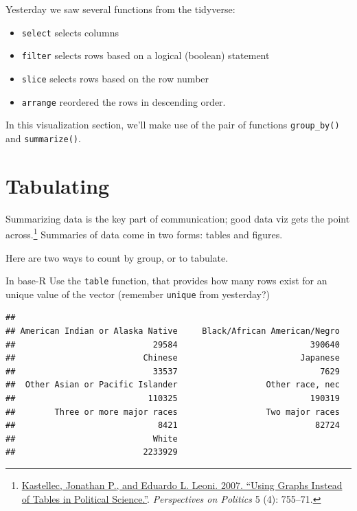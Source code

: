 \documentclass[]{book}
\newenvironment{Shaded}{\begin{snugshade}}{\end{snugshade}}
\newcommand{\KeywordTok}[1]{\textcolor[rgb]{0.13,0.29,0.53}{\textbf{#1}}}
\newcommand{\NormalTok}[1]{#1}
\newcommand{\OperatorTok}[1]{\textcolor[rgb]{0.81,0.36,0.00}{\textbf{#1}}}
\providecommand{\tightlist}{%
  \setlength{\itemsep}{0pt}\setlength{\parskip}{0pt}}
\let\rmarkdownfootnote\footnote%
\def\footnote{\protect\rmarkdownfootnote}
\theoremstyle{definition}
\theoremstyle{definition}
\theoremstyle{definition}
\theoremstyle{remark}
\begin{document}
Yesterday we saw several functions from the tidyverse:

\begin{itemize}
\tightlist
\item
  \texttt{select} selects columns
\item
  \texttt{filter} selects rows based on a logical (boolean) statement
\item
  \texttt{slice} selects rows based on the row number
\item
  \texttt{arrange} reordered the rows in descending order.
\end{itemize}

In this visualization section, we'll make use of the pair of functions \texttt{group\_by()} and \texttt{summarize()}.

\hypertarget{tabulating}{%
\section{Tabulating}\label{tabulating}}

Summarizing data is the key part of communication; good data viz gets the point across.\footnote{\href{http://www.princeton.edu/~jkastell/Tables2Graphs/graphs.pdf}{Kastellec, Jonathan P., and Eduardo L. Leoni. 2007. ``Using Graphs Instead of Tables in Political Science.''}. \emph{Perspectives on Politics} 5 (4): 755--71.} Summaries of data come in two forms: tables and figures.

Here are two ways to count by group, or to tabulate.

In base-R Use the \texttt{table} function, that provides how many rows exist for an unique value of the vector (remember \texttt{unique} from yesterday?)

\begin{Shaded}
\end{Shaded}

\begin{verbatim}
## 
## American Indian or Alaska Native     Black/African American/Negro 
##                            29584                           390640 
##                          Chinese                         Japanese 
##                            33537                             7629 
##  Other Asian or Pacific Islander                  Other race, nec 
##                           110325                           190319 
##        Three or more major races                  Two major races 
##                             8421                            82724 
##                            White 
##                          2233929
\end{verbatim}
\end{document}
